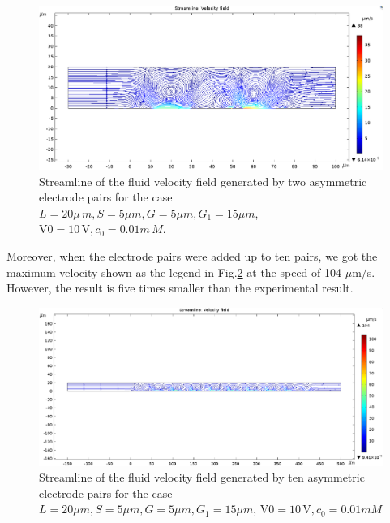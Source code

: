 \documentclass[journal,svgnames,twocolumn,x11names]{IEEEtran}
\begin{document}
\begin{figure}[htbp]
    \centering
    \includegraphics[scale=0.65]{streamline_two_pairs.PNG}
    \caption{Streamline of the fluid velocity field generated by two asymmetric electrode pairs for the case $L = 20\mu\,m, S = 5\mu m, G = 5\mu m, G_{1} = 15\mu m$, $\mathrm{V0=10\,V},c_{0} = 0.01 \textit{m}\,M$.}
    \label{fig:streamline_two}
\end{figure}
Moreover, when the electrode pairs were added up to ten pairs, we got the maximum velocity shown as the legend in Fig.\ref{fig:streamline_ten} at the speed of 104 $\mu$m/s. However, the result is five times smaller than the experimental result\cite{Studer2004}.
\begin{figure}[htbp]
    \centering
    \includegraphics[scale=0.6]{streamline_ten_pairs.PNG}
    \caption{Streamline of the fluid velocity field generated by ten asymmetric electrode pairs for the case $L = 20\mu m, S = 5\mu m, G = 5\mu m, G_{1} = 15\mu m$, $\mathrm{V0=10\,V}, c_{0} = 0.01 \textit{m}M$}
    \label{fig:streamline_ten}
\end{figure}
\end{document}
